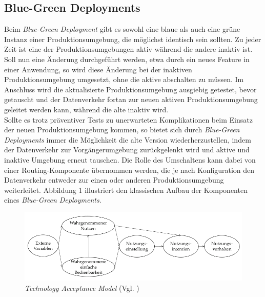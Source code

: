 \documentclass[deutsch]{lib/llncs/llncs}
\begin{document}
\subsection{Blue-Green Deployments}
Beim \textit{Blue-Green Deployment} gibt es sowohl eine blaue als auch eine grüne Instanz einer Produktionsumgebung, die möglichst identisch sein sollten. Zu jeder Zeit ist eine der Produktionsumgebungen aktiv während die andere inaktiv ist. Soll nun eine Änderung durchgeführt werden, etwa durch ein neues Feature in einer Anwendung, so wird diese Änderung bei der inaktiven Produktionsumgebung umgesetzt, ohne die aktive abschalten zu müssen. Im Anschluss wird die aktualisierte Produktionsumgebung ausgiebig getestet, bevor getauscht und der Datenverkehr fortan zur neuen aktiven Produktionsumgebung geleitet werden kann, während die alte inaktiv wird. \\
Sollte es trotz präventiver Tests zu unerwarteten Komplikationen beim Einsatz der neuen Produktionsumgebung kommen, so bietet sich durch \textit{Blue-Green Deployments} immer die Möglichkeit die alte Version wiederherzustellen, indem der Datenverkehr zur Vorgängerumgebung zurückgelenkt wird und aktive und inaktive Umgebung erneut tauschen. Die Rolle des Umschaltens kann dabei von einer Routing-Komponente übernommen werden, die je nach Konfiguration den Datenverkehr entweder zur einen oder anderen Produktionsumgebung weiterleitet. Abbildung 1 illustriert den klassischen Aufbau der Komponenten eines \textit{Blue-Green Deployments}. 	
\begin{figure}
	\centering
	\includegraphics[scale=0.40]{img/abbildung1.png}
	\caption{\textit{Technology Acceptance Model} (Vgl. \cite[S. 237]{bandow2010modell})}
\end{figure}






\end{document}

